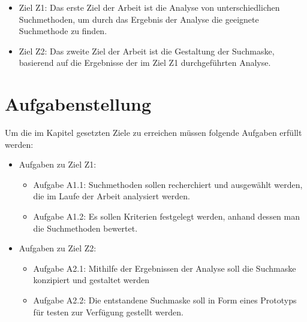 \begin{itemize}
\item Ziel Z1: Das erste Ziel der Arbeit ist die Analyse von unterschiedlichen Suchmethoden, um durch das Ergebnis der Analyse die geeignete Suchmethode zu finden.
\item Ziel Z2: Das zweite Ziel der Arbeit ist die Gestaltung der Suchmaske, basierend auf die Ergebnisse der im Ziel Z1 durchgeführten Analyse.
\end{itemize}


\section{Aufgabenstellung}\label{sec:aufgabenstellung}

Um die im Kapitel  gesetzten Ziele zu erreichen müssen folgende Aufgaben erfüllt werden:

\begin{itemize}
\item Aufgaben zu Ziel Z1:
	\begin{itemize}
	\item Aufgabe A1.1: Suchmethoden sollen recherchiert und ausgewählt werden, die im Laufe der Arbeit analysiert werden.
	\item Aufgabe A1.2: Es sollen Kriterien festgelegt werden, anhand dessen man die Suchmethoden bewertet.
	\end{itemize}
\item Aufgaben zu Ziel Z2:
	\begin{itemize}
	\item Aufgabe A2.1: Mithilfe der Ergebnissen der Analyse soll die Suchmaske konzipiert und gestaltet werden
	\item Aufgabe A2.2: Die entstandene Suchmaske soll in Form eines Prototyps für testen zur Verfügung gestellt werden.
	\end{itemize}
\end{itemize}

